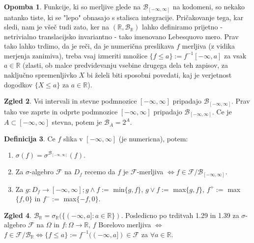 \documentclass[a4paper,12pt]{article}
\theoremstyle{definition} %
\newtheorem{definicija}{Definicija}[section]
\newtheorem{zgled}[definicija]{Zgled}
\newtheorem{opomba}[definicija]{Opomba}
\theoremstyle{plain} %
\newcommand{\R}{\mathbb{R}}
\newcommand{\F}{\mathcal{F}}
\begin{document}
            \begin{opomba}
                Funkcije, ki so merljive glede na $\mathcal{B}_{[-\infty, \infty]}$ na kodomeni, so nekako natanko tiste, ki se "lepo" 
                obnasajo s stalisca integracije. Pričakovanje tega, kar sledi, nam je všeč tudi zato, ker na $(\R, \mathcal{B}_\R)$ 
                lahko definiramo prijetno - netrivialno translacijsko invariantno - tako imenovano Lebesquovo mero. Prav tako lahko 
                trdimo, da je reči, da je numerična preslikava $f$ merljiva (z vidika merjenja zanimiva),
                 treba vsaj izmeriti množice $\{f \leq a\}:= f^{-1}{[-\infty, a]}$ za vsak $a \in \R$ (zlasti, 
                ob malce predvidevanju vsebine drugega dela teh zapisov, za naključno spremenljivko $X$ bi 
                želeli biti sposobni povedati, kaj je verjetnost dogodkov $\{X \leq a\}$ za $a \in \R$).
            \end{opomba}

            \begin{zgled}
                Vsi intervali in stevne podmnozice $[-\infty, \infty]$ pripadajo $\mathcal{B}_{[-\infty, \infty]}$. Prav tako vse zaprte in odprte podmnozice $[-\infty, \infty]$ pripadajo $\mathcal{B}_{[-\infty, \infty]}$. Ce je $A \subset [-\infty, \infty]$ stevna, potem je $\mathcal{B}_A = 2^A.$
            \end{zgled}
        
            \begin{definicija}
                Ce $f$ slika v $[-\infty, \infty]$ (je numericna), potem: 
                \begin{enumerate}
                    \item $\sigma(f) = \sigma^{\mathcal{B}_{[-\infty, \infty]}}(f)$.
                    \item Za $\sigma$-algebro $\F$ na $D_f$ recemo da $f$ je  $\F$-merljiva $\iff f \in \F/\mathcal{B}_{[-\infty, \infty]}$.
                    \item Za $g:D_f \rightarrow [-\infty, \infty]; g \land f :=$ min$\{g, f\}$,  $g \lor f:=$ max$\{g, f\}$, $f^+:=$ max$\{f, 0\}$ in  $f^-:=$ max$\{-f, 0\}$.
                \end{enumerate}
            \end{definicija}

            \begin{zgled}
                    $\mathcal{B}_\R = \sigma_\R(\{(-\infty, a]: a \in \R\})$. Posledicno po trditvah 1.29 in 1.39 za $\sigma$-algebro $\F$ na $\Omega$ in $f:\Omega \rightarrow \R$, $f$ Borelovo merljiva $\iff$ $f \in \F/\mathcal{B}_\R \iff \{f \leq a\}:= f^{-1}((-\infty, a]) \in \F$ za $\forall a \in \R.$
            \end{zgled}
\end{document}
